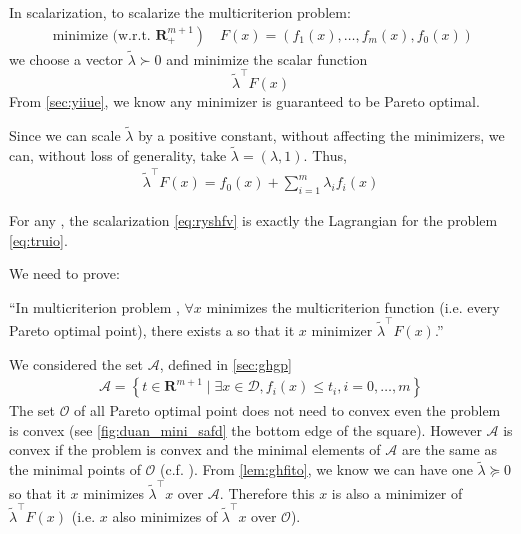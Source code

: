 \documentclass{article}
\begin{document}
In scalarization, to scalarize the multicriterion problem:
\begin{align*}
\text { minimize (w.r.t. } \left.\mathbf{R}_{+}^{m+1}\right) \quad F(x)=\left(f_{1}(x), \ldots, f_{m}(x), f_{0}(x)\right)
\end{align*}
we choose a  vector $\tilde{\lambda}\succ 0$  and minimize the scalar function $$\tilde{\lambda}^{\top} F(x)$$ From \cref{sec:yiiue}, we know any minimizer is guaranteed to be Pareto optimal. 

Since we can scale $\tilde{\lambda}$ by a positive constant, without affecting the minimizers, we can, without loss of generality, take $\tilde{\lambda}=(\lambda, 1) .$ Thus, 
\begin{align}
\tilde{\lambda}^{\top} F(x)=f_{0}(x)+\sum_{i=1}^{m} \lambda_{i} f_{i}(x)\label{eq:ryshfv}
\end{align}


For any , the scalarization \cref{eq:ryshfv} is exactly the Lagrangian for the problem \cref{eq:truio}.


We need to prove:

``In  multicriterion problem , $\forall x$ minimizes the multicriterion function (i.e. every Pareto optimal point),  there exists a  so that it $x$ minimizer $\tilde{\lambda}^{\top} F(x)$.''

We considered the set $\mathcal{A}$, defined in \cref{sec:ghgp}
\begin{align*}
\mathcal{A}=\left\{t \in \mathbf{R}^{m+1} \mid \exists x \in \mathcal{D}, f_{i}(x) \leq t_{i}, i=0, \ldots, m\right\}
\end{align*}
The set $\mathcal{O}$ of all Pareto optimal point does not need to convex even the problem is convex (see \cref{fig:duan_mini_safd} the bottom edge of the square). However $\mathcal{A}$ is convex if the problem is convex and the minimal elements of $\mathcal{A}$ are the same as the minimal points of $\mathcal{O}$ (c.f. \cite[ex 4.53]{boyd2004convex}). From \cref{lem:ghfito}, we know we can have one $\tilde{\lambda} \succeq 0$ so that it $x$ minimizes $\tilde{\lambda}^{\top} x$ over $\mathcal{A}$. Therefore this $x$ is also a minimizer of $\tilde{\lambda}^{\top} F(x)$ (i.e. $x$ also minimizes of $\tilde{\lambda}^{\top} x$ over $\mathcal{O}$).
\end{document}
